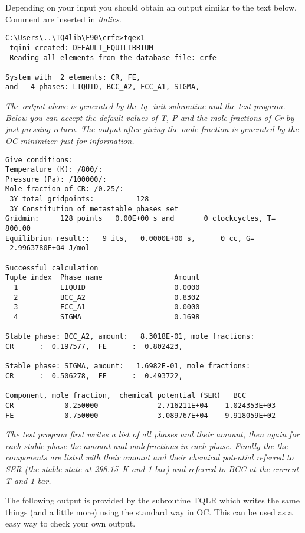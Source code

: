 \documentclass[12pt]{article}
\begin{document}
Depending on your input you should obtain an output similar to the
text below.  Comment are inserted in {\em italics}.

{\small
\begin{verbatim}
C:\Users\..\TQ4lib\F90\crfe>tqex1
 tqini created: DEFAULT_EQUILIBRIUM
 Reading all elements from the database file: crfe

System with  2 elements: CR, FE,
and   4 phases: LIQUID, BCC_A2, FCC_A1, SIGMA,

\end{verbatim}
}

{\em The output above is generated by the tq\_init subroutine and the
  test program.  Below you can accept the default values of T, P and
  the mole fractions of Cr by just pressing return.  The output after
  giving the mole fraction is generated by the OC minimizer just for
  information.}

{\small
\begin{verbatim}
Give conditions:
Temperature (K): /800/:
Pressure (Pa): /100000/:
Mole fraction of CR: /0.25/:
 3Y total gridpoints:          128
 3Y Constitution of metastable phases set
Gridmin:     128 points   0.00E+00 s and       0 clockcycles, T=  800.00
Equilibrium result::   9 its,   0.0000E+00 s,      0 cc, G= -2.9963780E+04 J/mol

Successful calculation
Tuple index  Phase name                 Amount
  1          LIQUID                     0.0000
  2          BCC_A2                     0.8302
  3          FCC_A1                     0.0000
  4          SIGMA                      0.1698

Stable phase: BCC_A2, amount:   8.3018E-01, mole fractions:
CR      :  0.197577,  FE      :  0.802423,

Stable phase: SIGMA, amount:   1.6982E-01, mole fractions:
CR      :  0.506278,  FE      :  0.493722,

Component, mole fraction,  chemical potential (SER)   BCC
CR            0.250000             -2.716211E+04   -1.024353E+03
FE            0.750000             -3.089767E+04   -9.918059E+02

\end{verbatim}
}

{\em The test program first writes a list of all phases and their
  amount, then again for each stable phase the amount and
  molefractions in each phase.  Finally the the components are listed
  with their amount and their chemical potential referred to SER (the
  stable state at 298.15~K and 1 bar) and referred to BCC at the
  current T and 1 bar.

  The following output is provided by the subroutine TQLR which writes
  the same things (and a little more) using the standard way in OC.
  This can be used as a easy way to check your own output.}
\end{document}
